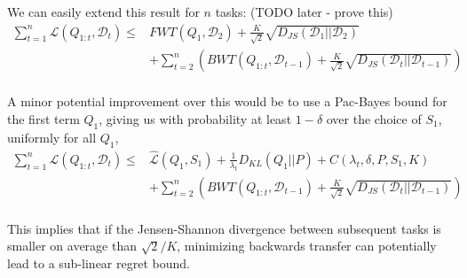 \documentclass[letterpaper]{article}
\theoremstyle{definition}
\begin{document}
We can easily extend this result for $n$ tasks: (TODO later - prove this) %
\begin{equation}
\begin{split}
 \sum_{t=1}^{n}\mathcal{L}(Q_{1:t}, \mathcal{D}_t) \leq &  FWT(Q_1, \mathcal{D}_2) + \frac{K}{\sqrt{2}}\sqrt{D_{JS}(\mathcal{D}_{1}||\mathcal{D}_{2})} \\ &+ \sum_{t=2}^{n}\left ( BWT(Q_{1:t}, \mathcal{D}_{t-1})+ \frac{K}{\sqrt{2}}\sqrt{D_{JS}(\mathcal{D}_{t}||\mathcal{D}_{t-1})}\right ) \\&
 \end{split}
\end{equation}

A minor potential improvement over this would be to use a Pac-Bayes bound for the first term $Q_1$, giving us with probability at least $1-\delta$ over the choice of $S_1$, uniformly for all $Q_1$,
\begin{equation}
\begin{split}
\sum_{t=1}^{n}\mathcal{L}(Q_{1:t}, \mathcal{D}_t) \leq &  \hat{\mathcal{L}}(Q_1, S_1)+\frac{1}{\lambda_t}D_{KL}(Q_1||P)+C(\lambda_t,\delta,P,S_1, K) \\ &+ \sum_{t=2}^{n}\left ( BWT(Q_{1:t}, \mathcal{D}_{t-1})+ \frac{K}{\sqrt{2}}\sqrt{D_{JS}(\mathcal{D}_{t}||\mathcal{D}_{t-1})}\right ) \\&
\end{split}
\end{equation}

This implies that if the Jensen-Shannon divergence between subsequent tasks is smaller on average than $\sqrt{2}/K$, minimizing backwards transfer can potentially lead to a sub-linear regret bound.

\clearpage


\end{document}
